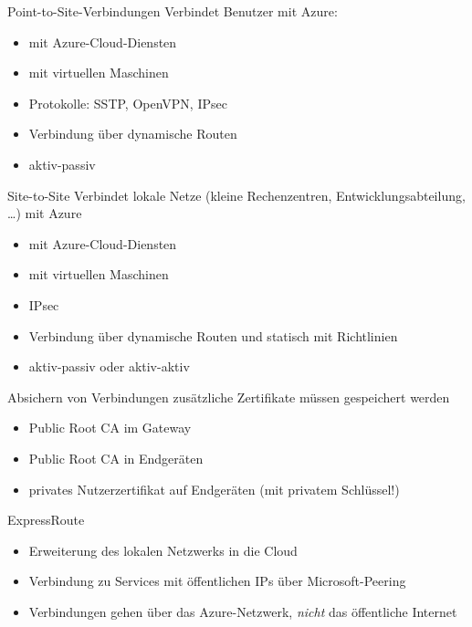 \begin{flashcard}[]{Point-to-Site-Verbindungen}
  Verbindet Benutzer mit Azure:
  \begin{itemize}
    \item mit Azure-Cloud-Diensten
    \item mit virtuellen Maschinen
    \item Protokolle: SSTP, OpenVPN, IPsec
    \item Verbindung über dynamische Routen
    \item aktiv-passiv
  \end{itemize}
\end{flashcard}

\begin{flashcard}[]{Site-to-Site}
  Verbindet lokale Netze (kleine Rechenzentren, Entwicklungsabteilung, \ldots) mit Azure
  \begin{itemize}
    \item mit Azure-Cloud-Diensten
    \item mit virtuellen Maschinen
    \item IPsec
    \item Verbindung über dynamische Routen und statisch mit Richtlinien
    \item aktiv-passiv oder aktiv-aktiv
  \end{itemize}
\end{flashcard}

\begin{flashcard}[]{Absichern von Verbindungen}
  zusätzliche Zertifikate müssen gespeichert werden
  \begin{itemize}
    \item Public Root CA im Gateway
    \item Public Root CA in Endgeräten
    \item privates Nutzerzertifikat auf Endgeräten (mit privatem Schlüssel!)
  \end{itemize}
\end{flashcard}

\begin{flashcard}[]{ExpressRoute}
  \begin{itemize}
    \item Erweiterung des lokalen Netzwerks in die Cloud
    \item Verbindung zu Services mit öffentlichen IPs über Microsoft-Peering
    \item Verbindungen gehen über das Azure-Netzwerk, \emph{nicht} das öffentliche Internet
  \end{itemize}
\end{flashcard}

